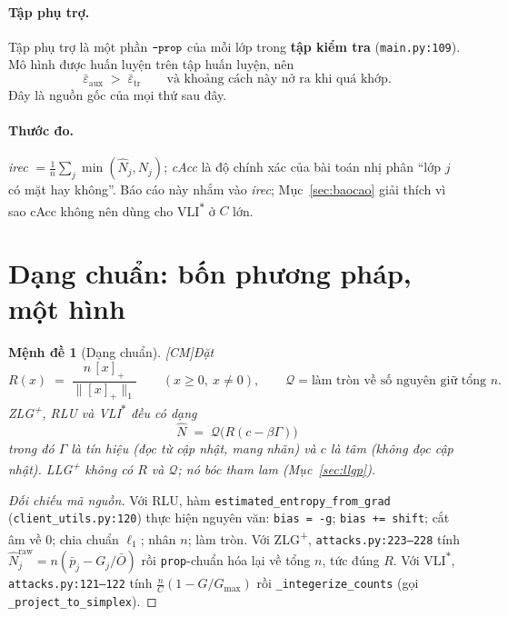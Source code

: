 \documentclass[11pt,a4paper]{article}
\newtheorem{menhde}[dinhly]{Mệnh đề}
\theoremstyle{remark}
\newcommand{\pos}[1]{\left[#1\right]_+}
\newcommand{\quant}{\mathcal{Q}}
\newcommand{\epstr}{\bar\varepsilon_{\mathrm{tr}}}
\newcommand{\epsaux}{\bar\varepsilon_{\mathrm{aux}}}
\newcommand{\code}[1]{\texttt{\small #1}}
\newcommand{\CM}{\textsf{[CM]}}
\begin{document}
\paragraph{Tập phụ trợ.} Tập phụ trợ là một phần $\code{--prop}$ của mỗi lớp
trong \textbf{tập kiểm tra} (\code{main.py:109}). Mô hình được huấn luyện trên
tập huấn luyện, nên
\[
  \epsaux \;>\; \epstr \qquad \text{và khoảng cách này nở ra khi quá khớp.}
\]
Đây là nguồn gốc của mọi thứ sau đây.

\paragraph{Thước đo.} \emph{irec} $=\frac1n\sum_j\min(\hat N_j,N_j)$;
\emph{cAcc} là độ chính xác của bài toán nhị phân ``lớp $j$ có mặt hay không''.
Báo cáo này nhắm vào \emph{irec}; Mục~\ref{sec:baocao} giải thích vì sao cAcc
không nên dùng cho VLI\textsuperscript{$*$} ở $C$ lớn.

\section{Dạng chuẩn: bốn phương pháp, một hình}

\begin{menhde}[Dạng chuẩn] \CM\label{md:dangchuan}
Đặt
\[
  R(x) \;=\; \frac{n\,\pos{x}}{\|\pos{x}\|_1}\qquad (x\ge 0,\ x\ne 0),
  \qquad
  \quant = \text{làm tròn về số nguyên giữ tổng } n .
\]
ZLG\textsuperscript{+}, RLU và VLI\textsuperscript{$*$} đều có dạng
\[
  \boxed{\;\hat N \;=\; \quant\!\big(R(c-\beta\Gamma)\big)\;}
\]
trong đó $\Gamma$ là \emph{tín hiệu} (đọc từ cập nhật, mang nhãn) và $c$ là
\emph{tâm} (không đọc cập nhật). LLG\textsuperscript{+} không có $R$ và
$\quant$; nó bóc tham lam (Mục~\ref{sec:llgp}).
\end{menhde}

\begin{proof}[Đối chiếu mã nguồn]
Với RLU, hàm \code{estimated\_entropy\_from\_grad} (\code{client\_utils.py:120})
thực hiện nguyên văn: \code{bias = -g}; \code{bias += shift}; cắt âm về 0; chia
chuẩn $\ell_1$; nhân $n$; làm tròn. Với ZLG\textsuperscript{+},
\code{attacks.py:223--228} tính $\hat N_j^{\text{raw}}=n(\bar p_j-G_j/\bar O)$
rồi \code{prop}-chuẩn hóa lại về tổng $n$, tức đúng $R$. Với
VLI\textsuperscript{$*$}, \code{attacks.py:121--122} tính
$\frac nC(1-G/G_{\max})$ rồi \code{\_integerize\_counts} (gọi
\code{\_project\_to\_simplex}).
\end{proof}
\end{document}
